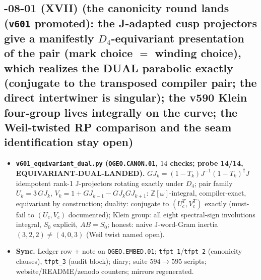 \subsection*{-08-01 (XVII) (the canonicity round lands (\texttt{v601} promoted): the J-adapted cusp projectors give a manifestly $D_4$-equivariant presentation of the pair (mark choice $=$ winding choice), which realizes the DUAL parabolic exactly (conjugate to the transposed compiler pair; the direct intertwiner is singular); the v590 Klein four-group lives integrally on the curve; the Weil-twisted RP comparison and the seam identification stay open)}
\begin{itemize}[leftmargin=1.5em]
\item \textbf{\texttt{v601\_equivariant\_dual.py} (\texttt{QGEO.CANON.01}, $14$ checks; probe
14/14, EQUIVARIANT-DUAL-LANDED).} $GJ_k=(1-T_k)J^{-1}(1-T_k)^\dagger J$ idempotent rank-1
J-projectors rotating exactly under $D_4$; pair family $U_k=3\,GJ_k$,
$V_k=1+GJ_{k-1}-GJ_kGJ_{k+1}$: $\mathbb{Z}[\omega]$-integral, compiler-exact, equivariant by
construction; duality: conjugate to $(U_c^T,V_c^T)$ exactly (must-fail to $(U_c,V_c)$
documented); Klein group: all eight spectral-sign involutions integral, $S_0$ explicit,
$AB=S_0$; honest: naive J-word-Gram inertia $(3,2,2)\ne(4,0,3)$ (Weil twist named open).
\item \textbf{Sync.} Ledger row + note on \texttt{QGEO.EMBED.01}; \texttt{tfpt\_1}/\texttt{tfpt\_2}
(canonicity clauses), \texttt{tfpt\_3} (audit block); diary; suite $594\to595$ scripts;
website/README/zenodo counters; mirrors regenerated.
\end{itemize}

